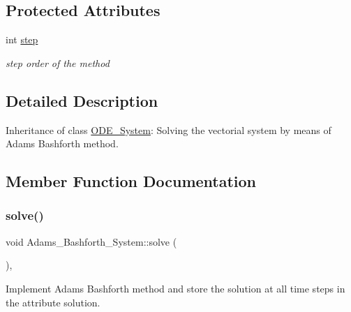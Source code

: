 \subsection*{Protected Attributes}
\begin{DoxyCompactItemize}
\item 
\mbox{\label{class_adams___bashforth___system_abc285f795f629737fb82c223b896c5e8}} 
int \mbox{\hyperlink{class_adams___bashforth___system_abc285f795f629737fb82c223b896c5e8}{step}}
\begin{DoxyCompactList}\small\item\em step order of the method \end{DoxyCompactList}\end{DoxyCompactItemize}


\subsection{Detailed Description}
Inheritance of class \mbox{\hyperlink{class_o_d_e___system}{O\+D\+E\+\_\+\+System}}\+: Solving the vectorial system by means of Adams Bashforth method. 

\subsection{Member Function Documentation}
\mbox{\label{class_adams___bashforth___system_aa34bb9a1367a3b15f606ff49054e9ece}} 
\subsubsection{\texorpdfstring{solve()}{solve()}}
{\footnotesize\ttfamily void Adams\+\_\+\+Bashforth\+\_\+\+System\+::solve (\begin{DoxyParamCaption}{ }\end{DoxyParamCaption})\hspace{0.3cm}{\ttfamily [override]}, {\ttfamily [virtual]}}



Implement Adams Bashforth method and store the solution at all time steps in the attribute solution. 


